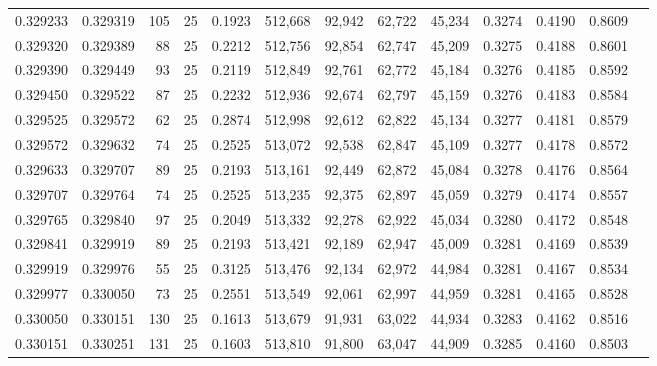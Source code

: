 \begin{tabular}{rrrrrrrrrrrrr}
0.329233 & 0.329319 &   105 &  25 &                                     0.1923 & 512,668 &  92,942 &  62,722 &  45,234 & 0.3274 & 0.4190 & 0.8609 \\
0.329320 & 0.329389 &    88 &  25 &                                     0.2212 & 512,756 &  92,854 &  62,747 &  45,209 & 0.3275 & 0.4188 & 0.8601 \\
0.329390 & 0.329449 &    93 &  25 &                                     0.2119 & 512,849 &  92,761 &  62,772 &  45,184 & 0.3276 & 0.4185 & 0.8592 \\
0.329450 & 0.329522 &    87 &  25 &                                     0.2232 & 512,936 &  92,674 &  62,797 &  45,159 & 0.3276 & 0.4183 & 0.8584 \\
0.329525 & 0.329572 &    62 &  25 &                                     0.2874 & 512,998 &  92,612 &  62,822 &  45,134 & 0.3277 & 0.4181 & 0.8579 \\
0.329572 & 0.329632 &    74 &  25 &                                     0.2525 & 513,072 &  92,538 &  62,847 &  45,109 & 0.3277 & 0.4178 & 0.8572 \\
0.329633 & 0.329707 &    89 &  25 &                                     0.2193 & 513,161 &  92,449 &  62,872 &  45,084 & 0.3278 & 0.4176 & 0.8564 \\
0.329707 & 0.329764 &    74 &  25 &                                     0.2525 & 513,235 &  92,375 &  62,897 &  45,059 & 0.3279 & 0.4174 & 0.8557 \\
0.329765 & 0.329840 &    97 &  25 &                                     0.2049 & 513,332 &  92,278 &  62,922 &  45,034 & 0.3280 & 0.4172 & 0.8548 \\
0.329841 & 0.329919 &    89 &  25 &                                     0.2193 & 513,421 &  92,189 &  62,947 &  45,009 & 0.3281 & 0.4169 & 0.8539 \\
0.329919 & 0.329976 &    55 &  25 &                                     0.3125 & 513,476 &  92,134 &  62,972 &  44,984 & 0.3281 & 0.4167 & 0.8534 \\
0.329977 & 0.330050 &    73 &  25 &                                     0.2551 & 513,549 &  92,061 &  62,997 &  44,959 & 0.3281 & 0.4165 & 0.8528 \\
0.330050 & 0.330151 &   130 &  25 &                                     0.1613 & 513,679 &  91,931 &  63,022 &  44,934 & 0.3283 & 0.4162 & 0.8516 \\
0.330151 & 0.330251 &   131 &  25 &                                     0.1603 & 513,810 &  91,800 &  63,047 &  44,909 & 0.3285 & 0.4160 & 0.8503 \\

\end{tabular}
